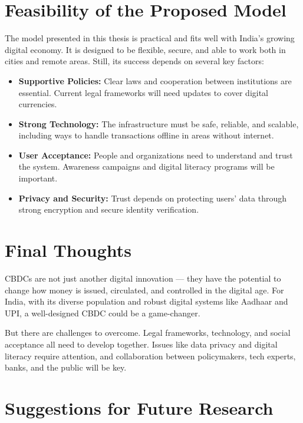 \section{Feasibility of the Proposed Model}

The model presented in this thesis is practical and fits well with India’s growing digital economy. It is designed to be flexible, secure, and able to work both in cities and remote areas. Still, its success depends on several key factors:

\begin{itemize}
    \item \textbf{Supportive Policies:} Clear laws and cooperation between institutions are essential. Current legal frameworks will need updates to cover digital currencies.
    \item \textbf{Strong Technology:} The infrastructure must be safe, reliable, and scalable, including ways to handle transactions offline in areas without internet.
    \item \textbf{User Acceptance:} People and organizations need to understand and trust the system. Awareness campaigns and digital literacy programs will be important.
    \item \textbf{Privacy and Security:} Trust depends on protecting users’ data through strong encryption and secure identity verification.
\end{itemize}

\section{Final Thoughts}

CBDCs are not just another digital innovation — they have the potential to change how money is issued, circulated, and controlled in the digital age. For India, with its diverse population and robust digital systems like Aadhaar and UPI, a well-designed CBDC could be a game-changer.

But there are challenges to overcome. Legal frameworks, technology, and social acceptance all need to develop together. Issues like data privacy and digital literacy require attention, and collaboration between policymakers, tech experts, banks, and the public will be key.

\section{Suggestions for Future Research}

